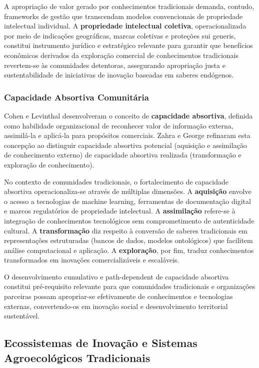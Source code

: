 A apropriação de valor gerado por conhecimentos tradicionais demanda, contudo, frameworks de gestão que transcendam modelos convencionais de propriedade intelectual individual. A \textbf{propriedade intelectual coletiva}, operacionalizada por meio de indicações geográficas, marcas coletivas e proteções sui generis, constitui instrumento jurídico e estratégico relevante para garantir que benefícios econômicos derivados da exploração comercial de conhecimentos tradicionais revertem-se às comunidades detentoras, assegurando apropriação justa e sustentabilidade de iniciativas de inovação baseadas em saberes endógenos.

\subsubsection{Capacidade Absortiva Comunitária}

Cohen e Levinthal \cite{CohenLevinthal1990} desenvolveram o conceito de \textbf{capacidade absortiva}, definida como habilidade organizacional de reconhecer valor de informação externa, assimilá-la e aplicá-la para propósitos comerciais. Zahra e George \cite{Zahra2002} refinaram esta concepção ao distinguir capacidade absortiva potencial (aquisição e assimilação de conhecimento externo) de capacidade absortiva realizada (transformação e exploração de conhecimento).

No contexto de comunidades tradicionais, o fortalecimento de capacidade absortiva operacionaliza-se através de múltiplas dimensões. A \textbf{aquisição} envolve o acesso a tecnologias de machine learning, ferramentas de documentação digital e marcos regulatórios de propriedade intelectual. A \textbf{assimilação} refere-se à integração de conhecimentos tecnológicos sem comprometimento de autenticidade cultural. A \textbf{transformação} diz respeito à conversão de saberes tradicionais em representações estruturadas (bancos de dados, modelos ontológicos) que facilitem análise computacional e aplicação. A \textbf{exploração}, por fim, traduz conhecimentos transformados em inovações comercializáveis e escaláveis.

O desenvolvimento cumulativo e path-dependent de capacidade absortiva constitui pré-requisito relevante para que comunidades tradicionais e organizações parceiras possam apropriar-se efetivamente de conhecimentos e tecnologias externas, convertendo-os em inovação social e desenvolvimento territorial sustentável.

\subsection{Ecossistemas de Inovação e Sistemas Agroecológicos Tradicionais}


